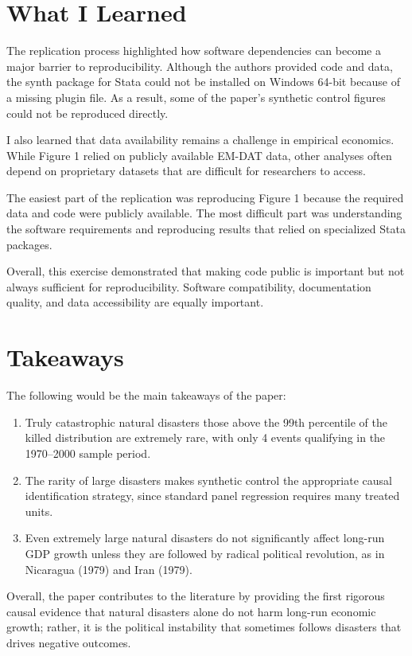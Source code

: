 \documentclass[12pt]{article}
\begin{document}
\section{What I Learned}

The replication process highlighted how software dependencies can become a major barrier to reproducibility. Although the authors provided code and data, the synth package for Stata could not be installed on Windows 64-bit because of a missing plugin file. As a result, some of the paper's synthetic control figures could not be reproduced directly.

I also learned that data availability remains a challenge in empirical economics. While Figure 1 relied on publicly available EM-DAT data, other analyses often depend on proprietary datasets that are difficult for researchers to access.

The easiest part of the replication was reproducing Figure 1 because the required data and code were publicly available. The most difficult part was understanding the software requirements and reproducing results that relied on specialized Stata packages.

Overall, this exercise demonstrated that making code public is important but not always sufficient for reproducibility. Software compatibility, documentation quality, and data accessibility are equally important.

\section{Takeaways}

The following would be the main takeaways of the paper:

\begin{enumerate}
    \item Truly catastrophic natural disasters those above the 99th percentile of the killed distribution are extremely rare, with only 4 events qualifying in the 1970--2000 sample period.
    \item The rarity of large disasters makes synthetic control the appropriate causal identification strategy, since standard panel regression requires many treated units.
    \item Even extremely large natural disasters do not significantly affect long-run GDP growth unless they are followed by radical political revolution, as in Nicaragua (1979) and Iran (1979).
\end{enumerate}

Overall, the paper contributes to the literature by providing the first rigorous causal evidence that natural disasters alone do not harm long-run economic growth; rather, it is the political instability that sometimes follows disasters that drives negative outcomes.
\end{document}
